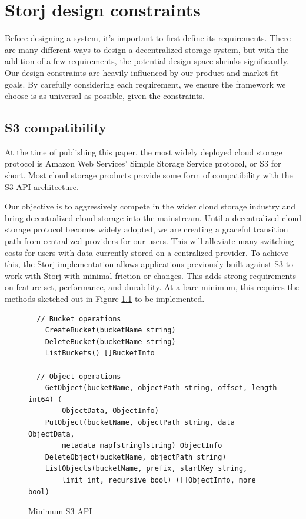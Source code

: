 \documentclass[11pt,fleqn,openany]{book}
\begin{document}
\chapter{Storj design constraints}\label{chap:design-constraints}

Before designing a system, it's important to first define its requirements.
There are many different ways to design a decentralized storage system, but
with the addition of a few requirements, the potential design space shrinks
significantly.
Our design constraints are heavily influenced by our product and
market fit goals.
By carefully considering each requirement, we ensure the framework
we choose is as universal as possible, given the constraints.

\section{S3 compatibility}

At the time of publishing this paper, the most widely deployed cloud storage
protocol is Amazon Web Services' Simple Storage Service protocol, or S3 for
short. Most cloud storage products provide some form of compatibility with the
S3 API architecture.

Our objective is to aggressively compete in the wider cloud
storage industry and bring decentralized cloud storage into the mainstream.
Until a decentralized cloud storage protocol becomes widely adopted,
we are creating a graceful transition path from centralized
providers for our users.
This will alleviate many switching costs for users with data currently stored on
a centralized provider.
To achieve this, the Storj implementation allows
applications previously built against S3 to work with Storj with
minimal friction or changes.
This adds strong requirements on feature set, performance, and durability.
At a bare minimum, this requires the methods sketched out in
Figure \ref{fig:s3-api-code} to be implemented.

\begin{figure}
\begin{lstlisting}
  // Bucket operations
	CreateBucket(bucketName string)
	DeleteBucket(bucketName string)
	ListBuckets() []BucketInfo

  // Object operations
	GetObject(bucketName, objectPath string, offset, length int64) (
	    ObjectData, ObjectInfo)
	PutObject(bucketName, objectPath string, data ObjectData,
	    metadata map[string]string) ObjectInfo
	DeleteObject(bucketName, objectPath string)
	ListObjects(bucketName, prefix, startKey string,
	    limit int, recursive bool) ([]ObjectInfo, more bool)
\end{lstlisting}
\caption{Minimum S3 API}
\label{fig:s3-api-code}
\end{figure}
\end{document}

